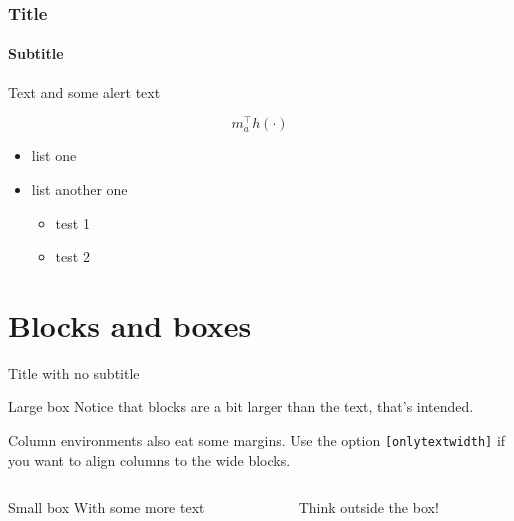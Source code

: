 \documentclass[11pt,aspectratio=169]{beamer}
\begin{document}
\begin{frame}

	\frametitle{Title}
	\framesubtitle{Subtitle}
	
	Text and some \alert{alert text}
	
	\[
	m_a^\top h(\cdot)
	\]
	
	
	\begin{itemize}
	\item list one
	\item list another one
		\begin{itemize}
		\item test 1
		\item test 2
		\end{itemize}
	\end{itemize}

\end{frame}

\section{Blocks and boxes}
\begin{frame}{Title with no subtitle}

	\begin{block}{Large box}
	Notice that blocks are a bit larger than the text, that's intended.
	\end{block}
	
	Column environments also eat some margins. Use the option \texttt{[onlytextwidth]} if you want to align columns to the wide blocks.
	
	\begin{columns}[onlytextwidth]
	\begin{column}{0.45\textwidth}
		\begin{block}{Small box}
		With some more text
		\end{block}
	\end{column}
	\begin{column}{0.5\textwidth}
		Think outside the box!
	\end{column}
	\end{columns}

\end{frame}
\end{document}
